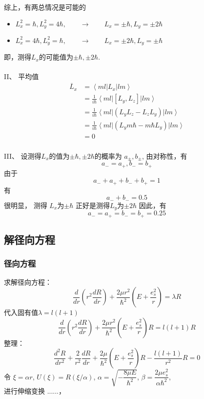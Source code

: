 \begin{frame}[label=current]
  \frametitle{}
综上，有两总情况是可能的
\begin{itemize}
  \item $L^2_x = \hbar, L^2_y = 4\hbar, \qquad \to \qquad  L_x = \pm \hbar, L_y = \pm 2\hbar$
  \item $L^2_x = 4\hbar, L^2_y = \hbar, \qquad \to \qquad  L_x = \pm 2\hbar, L_y = \pm \hbar$
\end{itemize}
即，测得$L_x$的可能值为$\pm \hbar, \pm 2\hbar$. \\
~~\\ 
II、 平均值
  \[ \begin{aligned}
    \overline{L}_x &= \left\langle ml \right\vert L_x \left\vert lm \right\rangle\\ 
    &= \frac{1}{i \hbar} \left\langle ml \right\vert [L_y, L_z] \left\vert lm \right\rangle\\
    &= \frac{1}{i \hbar} \left\langle ml \right\vert (L_yL_z - L_zL_y) \left\vert lm \right\rangle\\
    &= \frac{1}{i \hbar} \left\langle ml \right\vert (L_y m \hbar - m \hbar L_y) \left\vert lm \right\rangle\\
    &=0 
    \end{aligned} \]
\end{frame} 

\begin{frame}[label=current]
  \frametitle{}
III、 设测得$L_x$的值为$\pm \hbar, \pm 2\hbar$的概率为 $a_{\pm}, b_{\pm}$, 由对称性，有 
\[ a_{-} = a_{+},  b_{-} = b_{+}\]
由于
\[ a_{-} + a_{+} + b_{-} + b_{+} = 1\]
有
\[ a_{-} +  b_{-} = 0.5 \]
很明显， 测得 $L_x$为$\pm \hbar$ 正好是测得$L_y$为$\pm 2\hbar$
因此，有
\[ a_{-} = a_{+} = b_{-} = b_{+} = 0.25\]
\end{frame} 


\subsection{解径向方程}


\begin{frame}
\frametitle{径向方程}
求解径向方程：
\begin{equation*}
  \boxed{\frac{d}{d r} (r^2\frac{d R }{d r} ) + \frac{2 \mu r^2} {\hbar^2}(E+ \frac{e_s ^2}{r} ) =\lambda R}
\end{equation*}	
\解 代入固有值$ \lambda =l(l+1)  $
\begin{equation*}
  \frac{d}{d r} (r^2\frac{d R }{d r} ) + \frac{2 \mu r^2} {\hbar^2}(E+ \frac{e_s ^2}{r} ) R=l(l+1) R
\end{equation*}	
整理：
\begin{equation*}
  \frac{d^2 R}{d r^2} + \frac{2}{r^2}\frac{d R }{d r}  + \frac{2 \mu} {\hbar^2}(E+ \frac{e_s ^2}{r} ) R- \frac{l(l+1)}{r^2} R=0
\end{equation*}	
令 $\xi=\alpha r$, $U(\xi)=R(\xi /\alpha) $, $\alpha =\sqrt{-\dfrac{8\mu E}{\hbar^2}}$, $\beta=\dfrac{2\mu e^2 _s}{\alpha \hbar^2}$,\\
进行伸缩变换 ......，
\end{frame}	

